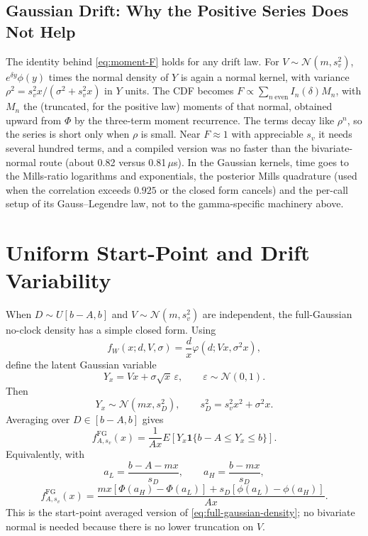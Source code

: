 \documentclass[12pt]{article}
\newcommand{\Normal}{\mathcal{N}}
\newcommand{\PhiN}{\Phi}
\newcommand{\phiN}{\phi}
\begin{document}
\subsection{Gaussian Drift: Why the Positive Series Does Not Help}
The identity behind \eqref{eq:moment-F} holds for any drift law. For $V\sim\Normal(m,s_v^2)$, $e^{\delta y}\phiN(y)$ times the normal density of $Y$ is again a normal kernel, with variance $\rho^2=s_v^2x/(\sigma^2+s_v^2x)$ in $Y$ units. The CDF becomes $F\propto\sum_{n\ \mathrm{even}}I_n(\delta)M_n$, with $M_n$ the (truncated, for the positive law) moments of that normal, obtained upward from $\PhiN$ by the three-term moment recurrence. The terms decay like $\rho^{n}$, so the series is short only when $\rho$ is small. Near $F\approx1$ with appreciable $s_v$ it needs several hundred terms, and a compiled version was no faster than the bivariate-normal route (about 0.82 versus 0.81\,$\mu$s). In the Gaussian kernels, time goes to the Mills-ratio logarithms and exponentials, the posterior Mills quadrature (used when the correlation exceeds $0.925$ or the closed form cancels) and the per-call setup of its Gauss--Legendre law, not to the gamma-specific machinery above.

\section{Uniform Start-Point and Drift Variability}
When $D\sim U[b-A,b]$ and $V\sim\Normal(m,s_v^2)$ are independent, the full-Gaussian no-clock density has a simple closed form. Using
\begin{equation}
  f_W(x;d,V,\sigma)=\frac{d}{x}\varphi(d;Vx,\sigma^2x),
\end{equation}
define the latent Gaussian variable
\begin{equation}
  Y_x=Vx+\sigma\sqrt{x}\,\varepsilon,
  \qquad \varepsilon\sim\Normal(0,1).
\end{equation}
Then
\begin{equation}
  Y_x\sim\Normal(mx,s_D^2),
  \qquad
  s_D^2=s_v^2x^2+\sigma^2x.
\end{equation}
Averaging over $D\in[b-A,b]$ gives
\begin{equation}
  f_{A,s_v}^{\mathrm{FG}}(x)=
  \frac{1}{Ax}E\left[Y_x\mathbf{1}\{b-A\le Y_x\le b\}\right].
\end{equation}
Equivalently, with
\begin{equation}
  a_L=\frac{b-A-mx}{s_D},
  \qquad
  a_H=\frac{b-mx}{s_D},
\end{equation}
\begin{equation}
  f_{A,s_v}^{\mathrm{FG}}(x)=
  \frac{mx\left[\PhiN(a_H)-\PhiN(a_L)\right]
  +s_D\left[\phiN(a_L)-\phiN(a_H)\right]}{Ax}.
  \label{eq:joint-full-density}
\end{equation}
This is the start-point averaged version of \eqref{eq:full-gaussian-density}; no bivariate normal is needed because there is no lower truncation on $V$.
\end{document}
